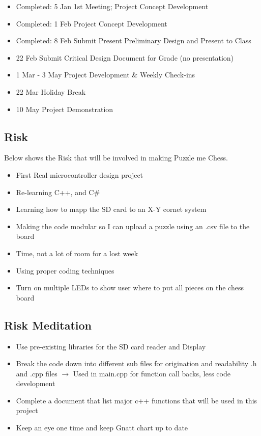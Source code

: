 \documentclass[11pt]{article}
\begin{document}
\begin{itemize}
\item Completed: 5 Jan	1st Meeting; Project Concept Development
\item Completed: 1  Feb	Project Concept Development 
\item Completed: 8 Feb	Submit Present Preliminary Design and Present to Class
\item 22 Feb	Submit Critical Design Document for Grade (no presentation)
\item 1 Mar - 3 May	Project Development \& Weekly Check-ins
\item 22 Mar	Holiday Break
\item 10 May	Project Demonstration
\end{itemize}

\subsection{Risk}
Below shows the Risk that will be involved in making Puzzle me Chess. 

\begin{itemize}
\item First Real microcontroller design project
\item Re-learning C++, and C\#
\item Learning how to mapp the SD card to an X-Y cornet system
\item Making the code modular so I can upload a puzzle using an .csv file to the board
\item Time, not a lot of room for a lost week
\item Using proper coding techniques  
\item Turn on multiple LEDs to show user where to put all pieces on the chess board
\end{itemize}

\subsection{Risk Meditation}

\begin{itemize}
\item Use pre-existing libraries for the SD card reader and Display
\item Break the code down into different sub files for origination and readability
\subitem .h and .cpp files $\rightarrow$ Used in main.cpp for function call backs, less code development
\item Complete a document that list major c++ functions that will be used in this project
\item Keep an eye one time and keep Gnatt chart up to date
\end{itemize}
\end{document}
